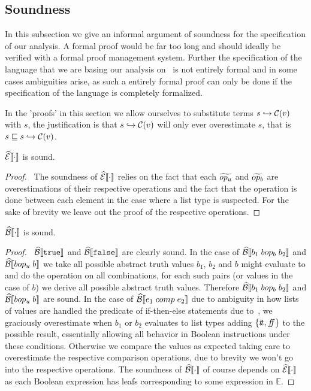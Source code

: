 \subsection{Soundness}\label{subsec:soundness}

In this subsection we give an informal argument of soundness for the specification of our analysis.
A formal proof would be far too long and should ideally be verified with a formal proof management system.
Further the specification of the language that we are basing our analysis on~\cite{halder_abstract_2012} is not entirely formal and in some cases ambiguities arise, as such a entirely formal proof can only be done if the specification of the language is completely formalized.

In the 'proofs' in this section we allow ourselves to substitute terms $s \hookrightarrow \mathcal{C}(v)$ with $s$, the justification is that $s \hookrightarrow \mathcal{C}(v)$ will only ever overestimate $s$, that is $s \sqsubseteq s \hookrightarrow \mathcal{C}(v)$.

\begin{conjecture}\label{thm:sound-exp}
    $\widehat{\mathcal{E}}\llbracket \cdot \rrbracket$ is sound.
\end{conjecture}
\begin{proof}
    \pfsketch\
    The soundness of $\widehat{\mathcal{E}}\llbracket \cdot \rrbracket$ relies on the fact that each $\widetilde{op_u}$ and $\widetilde{op_b}$ are overestimations of their respective operations and the fact that the operation is done between each element in the case where a list type is suspected.
    For the sake of brevity we leave out the proof of the respective operations.
\end{proof}

\begin{conjecture}\label{thm:sound-bool}
    $\widehat{\mathcal{B}}\llbracket \cdot \rrbracket$ is sound.
\end{conjecture}
\begin{proof}
    \pfsketch\
    $\widehat{\mathcal{B}}\llbracket \texttt{true} \rrbracket$ and $\widehat{\mathcal{B}}\llbracket \texttt{false} \rrbracket$ are clearly sound.
    In the case of $\widehat{\mathcal{B}}\llbracket b_1 \; bop_b \; b_2 \rrbracket$ and $\widehat{\mathcal{B}}\llbracket bop_u \; b \rrbracket$ we take all possible abstract truth values $b_1$, $b_2$ and $b$ might evaluate to and do the operation on all combinations, for each such pairs (or values in the case of $b$) we derive all possible abstract truth values.
    Therefore $\widehat{\mathcal{B}}\llbracket b_1 \; bop_b \; b_2 \rrbracket$ and $\widehat{\mathcal{B}}\llbracket bop_u \; b \rrbracket$ are sound.
    In the case of $\widehat{\mathcal{B}}\llbracket e_1 \; comp \; e_2 \rrbracket$ due to ambiguity in how lists of values are handled the predicate of if-then-else statements due to~\cite{halder_abstract_2012}, we graciously overestimate when $b_1$ or $b_2$ evaluates to list types adding $\{t\!t, f\!\!f\}$ to the possible result, essentially allowing all behavior in Boolean instructions under these conditions.
    Otherwise we compare the values as expected taking care to overestimate the respective comparison operations, due to brevity we won't go into the respective operations.
    The soundness of $\widehat{\mathcal{B}}\llbracket \cdot \rrbracket$ of course depends on $\widehat{\mathcal{E}}\llbracket \cdot \rrbracket$ as each Boolean expression has leafs corresponding to some expression in $\mathbb{E}$.
\end{proof}

